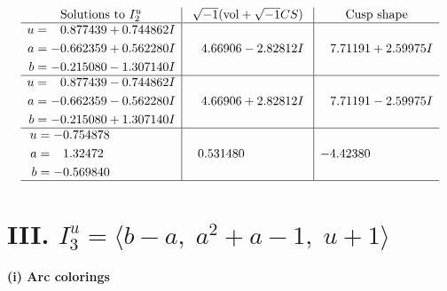 \documentclass[1p]{elsarticle_modified}
\theoremstyle{definition}
\newcommand{\I}{\sqrt{-1}}
\begin{document}
$$\begin{array}{c|c|c}  
\text{Solutions to }I^u_{2}& \I (\text{vol} + \sqrt{-1}CS) & \text{Cusp shape}\\
 \hline 
\begin{aligned}
u &= \phantom{-}0.877439 + 0.744862 I \\
a &= -0.662359 + 0.562280 I \\
b &= -0.215080 - 1.307140 I\end{aligned}
 & \phantom{-}4.66906 - 2.82812 I & \phantom{-}7.71191 + 2.59975 I \\ \hline\begin{aligned}
u &= \phantom{-}0.877439 - 0.744862 I \\
a &= -0.662359 - 0.562280 I \\
b &= -0.215080 + 1.307140 I\end{aligned}
 & \phantom{-}4.66906 + 2.82812 I & \phantom{-}7.71191 - 2.59975 I \\ \hline\begin{aligned}
u &= -0.754878\phantom{ +0.000000I} \\
a &= \phantom{-}1.32472\phantom{ +0.000000I} \\
b &= -0.569840\phantom{ +0.000000I}\end{aligned}
 & \phantom{-}0.531480\phantom{ +0.000000I} & -4.42380\phantom{ +0.000000I}\\
 \hline 
 \end{array}$$\newpage\newpage\renewcommand{\arraystretch}{1}
\centering \section*{III. $I^u_{3}= \langle b- a,\;a^2+a-1,\;u+1 \rangle$}
\flushleft \textbf{(i) Arc colorings}\\
\end{document}
